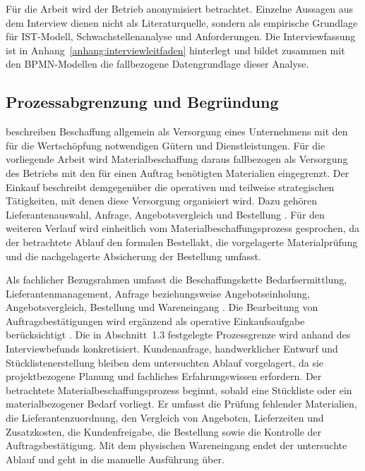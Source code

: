 \documentclass[a4paper,12pt]{article}
\begin{document}
Für die Arbeit wird der Betrieb anonymisiert betrachtet. Einzelne Aussagen aus dem Interview dienen nicht als Literaturquelle, sondern als empirische Grundlage für IST-Modell, Schwachstellenanalyse und Anforderungen. Die Interviewfassung ist in Anhang~\ref{anhang:interviewleitfaden} hinterlegt und bildet zusammen mit den BPMN-Modellen die fallbezogene Datengrundlage dieser Analyse.

\subsection{Prozessabgrenzung und Begründung}
\label{sec:prozessabgrenzung}
\Textcite{wannenwetsch_beschaffungs_2021} beschreiben Beschaffung allgemein als Versorgung eines Unternehmens mit den für die Wertschöpfung notwendigen Gütern und Dienstleistungen. Für die vorliegende Arbeit wird Materialbeschaffung daraus fallbezogen als Versorgung des Betriebs mit den für einen Auftrag benötigten Materialien eingegrenzt. Der Einkauf beschreibt demgegenüber die operativen und teilweise strategischen Tätigkeiten, mit denen diese Versorgung organisiert wird. Dazu gehören Lieferantenauswahl, Anfrage, Angebotsvergleich und Bestellung \parencite{bme_grundlagen_einkaufs_2016}. Für den weiteren Verlauf wird einheitlich vom Materialbeschaffungsprozess gesprochen, da der betrachtete Ablauf den formalen Bestellakt, die vorgelagerte Materialprüfung und die nachgelagerte Absicherung der Bestellung umfasst.

Als fachlicher Bezugsrahmen umfasst die Beschaffungskette Bedarfsermittlung, Lieferantenmanagement, Anfrage beziehungsweise Angebotseinholung, Angebotsvergleich, Bestellung und Wareneingang \parencite{bme_grundlagen_einkaufs_2016}. Die Bearbeitung von Auftragsbestätigungen wird ergänzend als operative Einkaufsaufgabe berücksichtigt \parencite{bme_grundlagen_einkaufs_2016}. Die in Abschnitt~1.3 festgelegte Prozessgrenze wird anhand des Interviewbefunds konkretisiert. Kundenanfrage, handwerklicher Entwurf und Stücklistenerstellung bleiben dem untersuchten Ablauf vorgelagert, da sie projektbezogene Planung und fachliches Erfahrungswissen erfordern. Der betrachtete Materialbeschaffungsprozess beginnt, sobald eine Stückliste oder ein materialbezogener Bedarf vorliegt. Er umfasst die Prüfung fehlender Materialien, die Lieferantenzuordnung, den Vergleich von Angeboten, Lieferzeiten und Zusatzkosten, die Kundenfreigabe, die Bestellung sowie die Kontrolle der Auftragsbestätigung. Mit dem physischen Wareneingang endet der untersuchte Ablauf und geht in die manuelle Ausführung über.
\end{document}
